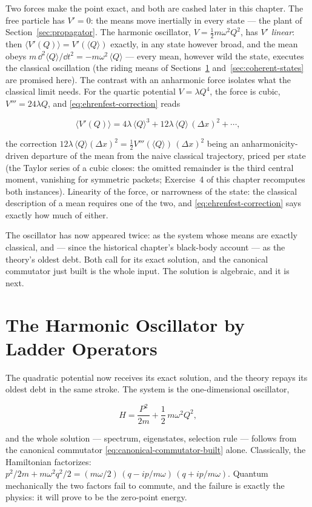 Two forces make the point exact, and both are cashed later in this chapter. The free particle has $V' = 0$: the means move inertially in every state --- the plant of Section~\ref{sec:propagator}. The harmonic oscillator, $V = \tfrac12 m\omega^2 Q^2$, has $V'$ \emph{linear}: then $\langle V'(Q)\rangle = V'(\langle Q\rangle)$ exactly, in any state however broad, and the mean obeys $m\,\dd^2\langle Q\rangle/\dd t^2 = -m\omega^2\,\langle Q\rangle$ --- every mean, however wild the state, executes the classical oscillation (the riding means of Sections~\ref{sec:harmonic-oscillator} and~\ref{sec:coherent-states} are promised here). The contrast with an anharmonic force isolates what the classical limit needs. For the quartic potential $V = \lambda Q^4$, the force is cubic, $V''' = 24\lambda Q$, and \eqref{eq:ehrenfest-correction} reads
\begin{linenomath}
    \begin{equation}
        \bigl\langle V'(Q)\bigr\rangle = 4\lambda\,\langle Q\rangle^3 + 12\lambda\,\langle Q\rangle\,(\Delta x)^2 + \cdots,
    \end{equation}
\end{linenomath}
the correction $12\lambda\,\langle Q\rangle(\Delta x)^2 = \tfrac12 V'''(\langle Q\rangle)\,(\Delta x)^2$ being an anharmonicity-driven departure of the mean from the naive classical trajectory, priced per state (the Taylor series of a cubic closes: the omitted remainder is the third central moment, vanishing for symmetric packets; Exercise~4 of this chapter recomputes both instances). Linearity of the force, or narrowness of the state: the classical description of a mean requires one of the two, and \eqref{eq:ehrenfest-correction} says exactly how much of either.

The oscillator has now appeared twice: as the system whose means are exactly classical, and --- since the historical chapter's black-body account --- as the theory's oldest debt. Both call for its exact solution, and the canonical commutator just built is the whole input. The solution is algebraic, and it is next.

\section{The Harmonic Oscillator by Ladder Operators}
\label{sec:harmonic-oscillator}

The quadratic potential now receives its exact solution, and the theory repays its oldest debt in the same stroke. The system is the one-dimensional oscillator,
\begin{linenomath}
    \begin{equation}
        H = \frac{P^2}{2m} + \frac{1}{2}\,m\omega^2 Q^2,
    \end{equation}
\end{linenomath}
and the whole solution --- spectrum, eigenstates, selection rule --- follows from the canonical commutator \eqref{eq:canonical-commutator-built} alone. Classically, the Hamiltonian factorizes: $p^2/2m + m\omega^2 q^2/2 = (m\omega/2)\,(q - ip/m\omega)\,(q + ip/m\omega)$. Quantum mechanically the two factors fail to commute, and the failure is exactly the physics: it will prove to be the zero-point energy.

